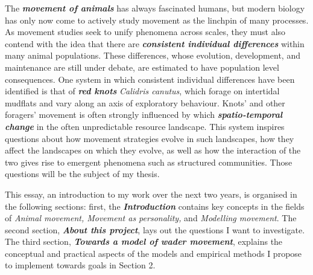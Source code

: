 \documentclass[]{scrartcl}
\begin{document}
The \emph{\textbf{movement of animals}} has always fascinated humans,
but modern biology has only now come to actively study movement as the
linchpin of many processes. As movement studies seek to unify phenomena
across scales, they must also contend with the idea that there are
\emph{\textbf{consistent individual differences}} within many animal
populations. These differences, whose evolution, development, and
maintenance are still under debate, are estimated to have population
level consequences. One system in which consistent individual
differences have been identified is that of \emph{\textbf{red knots}}
\emph{Calidris canutus}, which forage on intertidal mudflats and vary
along an axis of exploratory behaviour. Knots' and other foragers'
movement is often strongly influenced by which
\emph{\textbf{spatio-temporal change}} in the often unpredictable
resource landscape. This system inspires questions about how movement
strategies evolve in such landscapes, how they affect the landscapes on
which they evolve, as well as how the interaction of the two gives rise
to emergent phenomena such as structured communities. Those questions
will be the subject of my thesis.

This essay, an introduction to my work over the next two years, is
organised in the following sections: first, the
\emph{\textbf{Introduction}} contains key concepts in the fields of
\emph{Animal movement, Movement as personality,} and \emph{Modelling
movement}. The second section, \emph{\textbf{About this project}}, lays
out the questions I want to investigate. The third section,
\emph{\textbf{Towards a model of wader movement}}, explains the
conceptual and practical aspects of the models and empirical methods I
propose to implement towards goals in Section 2.
\end{document}
